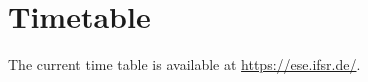 %
\thispagestyle{empty}

\chapter*{Timetable}

The current time table is available at \url{https://ese.ifsr.de/}.

%
%
